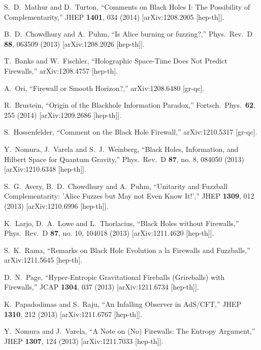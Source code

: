 \documentclass[12pt]{article}
\begin{document}
\begin{thebibliography}{99}
  S.~D.~Mathur and D.~Turton,
  ``Comments on Black Holes I: The Possibility of Complementarity,''
  JHEP {\bf 1401}, 034 (2014)
  [arXiv:1208.2005 [hep-th]]. 

  B.~D.~Chowdhury and A.~Puhm,
  ``Is Alice burning or fuzzing?,''
  Phys.\ Rev.\ D {\bf 88}, 063509 (2013)
  [arXiv:1208.2026 [hep-th]].  

  T.~Banks and W.~Fischler,
  ``Holographic Space-Time Does Not Predict Firewalls,''
  arXiv:1208.4757 [hep-th].  

  A.~Ori,
  ``Firewall or Smooth Horizon?,''
  arXiv:1208.6480 [gr-qc]. 

  R.~Brustein,
  ``Origin of the Blackhole Information Paradox,''
  Fortsch.\ Phys.\  {\bf 62}, 255 (2014)
  [arXiv:1209.2686 [hep-th]].

  S.~Hossenfelder,
  ``Comment on the Black Hole Firewall,''
  arXiv:1210.5317 [gr-qc].

  Y.~Nomura, J.~Varela and S.~J.~Weinberg,
  ``Black Holes, Information, and Hilbert Space for Quantum Gravity,''
  Phys.\ Rev.\ D {\bf 87}, no. 8, 084050 (2013)
  [arXiv:1210.6348 [hep-th]].

  S.~G.~Avery, B.~D.~Chowdhury and A.~Puhm,
  ``Unitarity and Fuzzball Complementarity: 'Alice Fuzzes but May not Even Know It!',''
  JHEP {\bf 1309}, 012 (2013)
  [arXiv:1210.6996 [hep-th]].

  K.~Larjo, D.~A.~Lowe and L.~Thorlacius,
  ``Black Holes without Firewalls,''
  Phys.\ Rev.\ D {\bf 87}, no. 10, 104018 (2013)
  [arXiv:1211.4620 [hep-th]].

  S.~K.~Rama,
  ``Remarks on Black Hole Evolution a la Firewalls and Fuzzballs,''
  arXiv:1211.5645 [hep-th].

  D.~N.~Page,
  ``Hyper-Entropic Gravitational Fireballs (Grireballs) with Firewalls,''
  JCAP {\bf 1304}, 037 (2013)
  [arXiv:1211.6734 [hep-th]].

  K.~Papadodimas and S.~Raju,
  ``An Infalling Observer in AdS/CFT,''
  JHEP {\bf 1310}, 212 (2013)
  [arXiv:1211.6767 [hep-th]].

  Y.~Nomura and J.~Varela,
  ``A Note on (No) Firewalls: The Entropy Argument,''
  JHEP {\bf 1307}, 124 (2013)
  [arXiv:1211.7033 [hep-th]].


\end{thebibliography}
\end{document}
